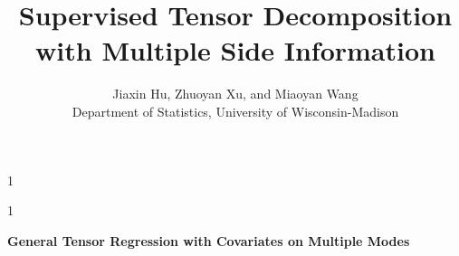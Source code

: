 \documentclass[12pt]{article}
\newcommand{\blind}{1}
\theoremstyle{plain}
\theoremstyle{definition}
\begin{document}
%

\def\spacingset#1{\renewcommand{\baselinestretch}%
{#1}\small\normalsize} \spacingset{1}



\blind
{
  \title{\bf Supervised Tensor Decomposition with Multiple Side Information}
  \author{Jiaxin Hu, Zhuoyan Xu, and Miaoyan Wang\\
    Department of Statistics, University of Wisconsin-Madison}
  \maketitle
} \fi

\blind
{
  \bigskip
  \bigskip
  \bigskip
  \begin{center}
    {\LARGE\bf General Tensor Regression with Covariates on Multiple Modes}
\end{center}
  \medskip
} \fi
\end{document}
